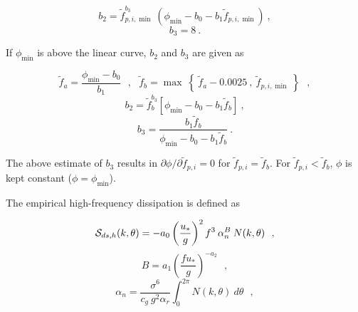 
\begin{equation}
b_2 = \tilde{f}_{p,i,\min}^{b_3} \: \left ( \phi_{\min} - b_0
- b_1 \tilde{f}_{p,i,\min} \right ) \: , \label{eq:b_21}
\end{equation} \begin{equation}
b_3 = 8 \: . \label{eq:b_31}
\end{equation}

\noindent
If $\phi_{\min}$ is above the linear curve, $b_2$ and $b_3$ are given as


\begin{equation}
\tilde{f}_a = \frac{\phi_{\min} - b_0}{b_1} \:\:\: , \:\:\:
\tilde{f}_b = \max \: \left \{ \: \tilde{f}_a - 0.0025 \: , \:
\tilde{f}_{p,i,\min} \: \right \} \:\:\: , \label{eq:f_a}
\end{equation} \begin{equation}
b_2 = \tilde{f}_b^{b_3} \left [ \phi_{\min} - b_0 -
b_1 \tilde{f}_b \right ] \: , \label{eq:b_22}
\end{equation} \begin{equation}
b_3 = \frac{b_1 \tilde{f}_b}{\phi_{\min} -b_0 -b_1 \tilde{f}_b}
\: . \label{eq:b_32}
\end{equation}

\noindent
The above estimate of $b_3$ results in $\partial \phi / \partial
\tilde{f}_{p,i} = 0$ for $\tilde{f}_{p,i} = \tilde{f}_b$. For $\tilde{f}_{p,i}
< \tilde{f}_b$, $\phi$ is kept constant ($\phi = \phi_{\min}$).


The empirical high-frequency dissipation is defined as


\begin{equation}
\cS_{ds,h}(k,\theta) = - a_0 \left ( \frac{u_\ast}{g} \right ) ^2  f^3 \:
\alpha_n^B \: N(k,\theta) \:\:\: , \label{eq:TCdh}
\end{equation} \begin{displaymath}
B = a_1 \left( \frac{ f u_\ast}{g} \right ) ^{-a_2}
\:\:\: , \end{displaymath} \begin{equation}
\alpha_n = \frac{\sigma^6}{c_g \: g^2 \alpha_r} \int_0^{2\pi} N(k,\theta) \: d\theta
\:\:\: , \label{eq:alpha_n} \end{equation}

